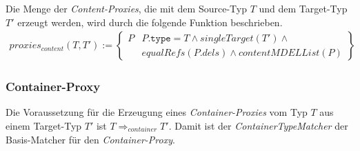 \documentclass[a4paper,12pt]{article}
\begin{document}
Die Menge der \emph{Content-Proxies}, die mit dem Source-Typ $T$ und dem Target-Typ $T'$ erzeugt werden, wird durch die folgende Funktion beschrieben.
\begin{gather*}
\mathit{proxies_{content}(T,T')} := 
\left\{\begin{array}{l|l}
	P	& P\texttt{.type} = T \wedge  \mathit{singleTarget(T')} \wedge \mathit{ }\\
		& \mathit{equalRefs(P.dels)} \wedge \mathit{contentMDELList(P)} 
		 \end{array}
\right\}
\end{gather*}
\subsubsection{Container-Proxy}
Die Voraussetzung für die Erzeugung eines \emph{Container-Proxies} vom Typ $T$ aus einem Target-Typ $T'$ ist $T \Rightarrow_{container} T'$. Damit ist der \emph{ContainerTypeMatcher} der Basis-Matcher für den \emph{Container-Proxy}.
\end{document}
